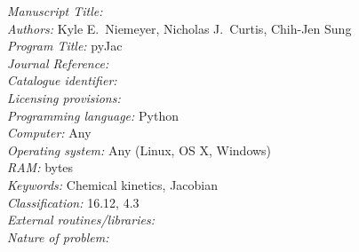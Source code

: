 \documentclass[preprint,12pt]{elsarticle}
\newcounter{bla}
\begin{document}
\begin{small}
\noindent
{\em Manuscript Title:}                                       \\
{\em Authors:} Kyle E.\ Niemeyer, Nicholas J.\ Curtis, Chih-Jen Sung \\
{\em Program Title:} pyJac                                    \\
{\em Journal Reference:}                                      \\
{\em Catalogue identifier:}                                   \\
{\em Licensing provisions:}                                   \\
{\em Programming language:} Python                            \\
{\em Computer:} Any                                              \\
{\em Operating system:} Any (Linux, OS X, Windows)            \\
{\em RAM:} bytes                                              \\
{\em Keywords:} Chemical kinetics, Jacobian  \\
{\em Classification:} 16.12, 4.3                                \\
{\em External routines/libraries:}                            \\
{\em Nature of problem:}\\

\end{small}
\end{document}
